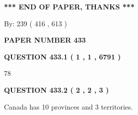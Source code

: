 \documentclass[12pt]{article}
\begin{document}
 
 
 
   
   
 \vspace{0.2in}
 
   
   
   
   
\vspace{1.0in} 
{\textbf{\large{ *** END OF PAPER, THANKS *** }}} 
   
   
\hspace{1.0in} By: 
 239 ( 416 ,  613 )
   
   
   
   
\newpage 
\setcounter{page}{ 
   433001 } 
   
   
   
   
 {\textbf{ \Large{ PAPER NUMBER  433  }}}
   
   
\vspace{0.2in}
   
   
   
   
   
   
 \vspace{0.2in}
 
 
 
 
   
   
  
\vspace{0.2in}
  
{\textbf{\Large{QUESTION
433.1 
 ( 1 , 1 , 6791 )
}}}
  
  
 
 
\noindent{}

78
 
 
  
\vspace{0.2in}
  
{\textbf{\Large{QUESTION
433.2 
 ( 2 , 2 , 3 )
}}}
  
  
 
 
\noindent{}
 
 
Canada has 10  provinces and 3 territories.
 
 
 
 
   
   
 \vspace{0.2in}
 
   
   
\end{document}
